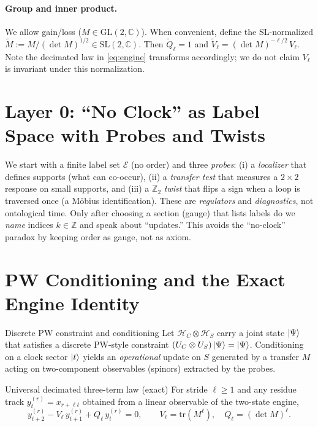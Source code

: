 \documentclass[11pt]{article}
\newcommand{\M}{M}
\begin{document}
\paragraph{Group and inner product.}
We allow gain/loss ($M\in\mathrm{GL}(2,\mathbb C)$). When convenient, define the SL-normalized
$\widetilde M:=M/(\det M)^{1/2}\in\mathrm{SL}(2,\mathbb C)$. Then
$\widetilde Q_\ell=1$ and $\widetilde V_\ell=(\det M)^{-\ell/2}\,V_\ell$.
Note the decimated law in \eqref{eq:engine} transforms accordingly; we do not claim $V_\ell$
is invariant under this normalization.


\section{Layer 0: ``No Clock'' as Label Space with Probes and Twists}
We start with a finite label set $\mathcal E$ (no order) and three \emph{probes}:
(i) a \emph{localizer} that defines supports (what can co-occur),
(ii) a \emph{transfer test} that measures a $2\times2$ response on small supports, and
(iii) a $\mathbb Z_2$ \emph{twist} that flips a sign when a loop is traversed once (a Möbius identification).
These are \emph{regulators} and \emph{diagnostics}, not ontological time.
Only after choosing a section (gauge) that lists labels do we \emph{name} indices $k\in\mathbb Z$ and speak about ``updates.''
This avoids the ``no-clock'' paradox by keeping order as gauge, not as axiom.

\section{PW Conditioning and the Exact Engine Identity}
\begin{mydef}{Discrete PW constraint and conditioning}
Let $\mathcal H_C\otimes\mathcal H_S$ carry a joint state $\ket{\Psi}$ that satisfies a discrete PW-style constraint $(U_C\otimes U_S)\ket{\Psi}=\ket{\Psi}$.
Conditioning on a clock sector $\ket{t}$ yields an \emph{operational} update on $S$ generated by a transfer $\M$ acting on two-component observables (spinors) extracted by the probes.
\end{mydef}

\begin{mythm}{Universal decimated three-term law (exact)}
For stride $\ell\ge1$ and any residue track $y^{(r)}_t=x_{r+\ell t}$ obtained from a linear observable of the two-state engine,
\begin{equation}
y^{(r)}_{t+2}-V_\ell\,y^{(r)}_{t+1}+Q_\ell\,y^{(r)}_{t}=0,\qquad
V_\ell=\mathrm{tr}(\M^\ell),\quad Q_\ell=(\det\M)^\ell.
\label{eq:engine}
\end{equation}
\end{mythm}
\end{document}
